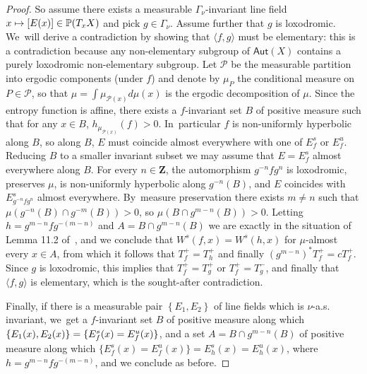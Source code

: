 \documentclass[JEP,XML,SOM,Unicode,published]{cedram}
\newcommand\mto{\mathchoice{\longmapsto}{\mapsto}{\mapsto}{\mapsto}}
\newcommand{\set}[1]{\left\{#1\right\}}
\newcommand{\aset}[1]{\{#1\}}
\newcommand{\pp}{\mathbb{P}}\let\P\pp
\def\Z{\mathbf{Z}}
\newcommand\Aut{\mathsf{Aut}}
\theoremstyle{plain}
\theoremstyle{definition}
\begin{document}
\begin{proof}
So assume there exists a measurable $\Gamma_\nu$-invariant line field
$x\mto [E(x)]\in \pp(T_xX)$ and pick $g\in \Gamma_\nu$. Assume further that $g$ is loxodromic. We~will derive a contradiction by
showing that $\langle f, g\rangle$ must be elementary: this is a contradiction because
any non-elementary subgroup of $\Aut(X)$ contains a purely loxodromic non-elementary subgroup.
Let $\mathcal P$ be the measurable partition into ergodic components (under $f$) and
denote by $\mu_P$ the conditional
measure on $P\in \mathcal P$, so
that $\mu = \int \mu_{\mathcal P(x)} d\mu(x)$ is the ergodic decomposition of $\mu$.
Since the entropy function is affine, there exists a $f$-invariant
set $B$ of positive measure such that
for any $x\in B$, $h_{\mu_{\mathcal P(x)}}(f)>0$. In~particular $f$ is non-uniformly hyperbolic along $B$, so
along $B$, $E$ must coincide almost everywhere with one of $E^s_f$ or $E^u_f$. Reducing $B$ to a smaller
invariant subset we may
assume that $E = E^s_f$ almost everywhere along $B$.
For every $n\in \Z$, the automorphism $g^{-n} f g^n$ is loxodromic, preserves $\mu$, is
non-uniformly hyperbolic along $g^{-n}(B)$, and $E$ coincides with $E^s_{g^{-n}fg^n}$ almost everywhere. By~measure preservation
there exists $m\neq n$ such that $\mu(g^{-n}(B)\cap g^{-m}(B))>0$, so
$\mu(B\cap g^{m-n}(B))>0$. Letting $h = g^{m-n}fg^{-(m-n)}$ and
$A = B\cap g^{m-n}(B)$ we are exactly in the situation of Lemma 11.2 of~\cite{stiffness}, and
we conclude that $W^s(f, x) = W^s(h, x)$ for $\mu$-almost every $x\in A$, from which it follows that
$T^+_f= T^+_h$ and finally $(g^{m-n})^*T_f^+ = c T^+_f$. Since $g$ is loxodromic, this implies
that $T^+_f = T^+_g$ or $T^+_f = T^-_g$, and finally that $\langle f, g\rangle$ is elementary, which is
the sought-after contradiction.\enlargethispage{.5\baselineskip}%

Finally, if there is a measurable pair $\set{E_1, E_2}$ of line fields which is $\nu$-a.s.
invariant, we~get a $f$-invariant set $B$ of positive measure along which
$\aset{E_1(x), E_2(x) } = \aset{E^s_f(x) =\nobreak E^u_f(x)}$, and a set
$A = B\cap g^{m-n}(B)$ of positive measure along which
$\aset{E^s_f(x) = E^u_f(x)} = {E^s_h(x) = E^u_h(x)}$, where $h = g^{m-n}fg^{-(m-n)}$, and we conclude as before.
\end{proof}

\backmatter


\end{document}
